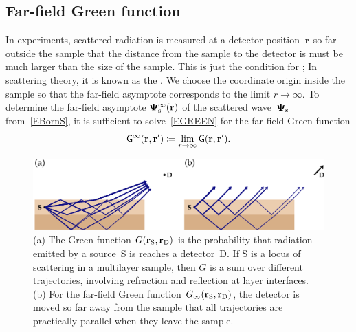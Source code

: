 \subsection{Far-field Green function}\label{SDWGreen}

In experiments, scattered radiation is measured
at a detector position~$\mathbf{r}$ so far outside the sample
that the distance from the sample to the detector
is must be much larger than the size of the sample.
This is just the condition for ;
%
In scattering theory,
it is known as the .
%
We choose the coordinate origin
%
%
inside the sample so that the far-field asymptote corresponds to the limit $r\to\infty$.
To determine the far-field asymptote $\mathbf{\Psi}_\text{s}^\infty(\mathbf{r})$
of the scattered wave~$\mathbf{\Psi}_\text{s}$ from~\cref{EBornS},
it is sufficient to solve~\cref{EGREEN} for the far-field Green function
\begin{equation}\label{EGinftydef}
  \mathsf{G}^\infty(\mathbf{r},\mathbf{r}')\coloneqq \lim_{r\to\infty} \mathsf{G}(\mathbf{r},\mathbf{r}').
\end{equation}
%

\begin{figure}[tb]
\begin{center}
\includegraphics[width=1\textwidth]{fig/drawing/Green1.ps}
\end{center}
\caption{(a)
The Green function $G(\mathbf{r}_\text{S},\mathbf{r}_\text{D})$
%
is the probability that radiation emitted
by a source~S is reaches a detector~D.
If S is a locus of scattering in a multilayer sample,
then $G$ is a sum over different trajectories,
involving refraction and reflection
at layer interfaces.
(b) For the far-field
%
Green function $G_\infty(\mathbf{r}_\text{S},\mathbf{r}_\text{D})$,
the detector is moved so far away from the sample
that all trajectories are practically parallel when they leave the sample.}
\label{Fgreen1}
\end{figure}

